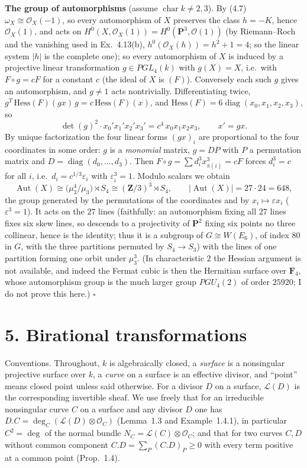 \documentclass[11pt]{article}
\begin{document}
\textbf{The group of automorphisms} (assume $\operatorname{char}k\ne2,3$). By (4.7) $\omega_X\cong\mathcal O_X(-1)$, so every automorphism of $X$ preserves the class $h=-K$, hence $\mathcal O_X(1)$, and acts on $H^0(X,\mathcal O_X(1))=H^0(\mathbf P^3,\mathcal O(1))$ (by Riemann--Roch and the vanishing used in Ex.~4.13(b), $h^0(\mathcal O_X(h))=h^2+1=4$; so the linear system $|h|$ is the complete one); so every automorphism of $X$ is induced by a projective linear transformation $g\in PGL_4(k)$ with $g(X)=X$, i.e.\ with $F\circ g=cF$ for a constant $c$ (the ideal of $X$ is $(F)$). Conversely each such $g$ gives an automorphism, and $g\neq 1$ acts nontrivially. Differentiating twice, $g^{T}\,\mathrm{Hess}(F)(gx)\,g=c\,\mathrm{Hess}(F)(x)$, and $\mathrm{Hess}(F)=6\operatorname{diag}(x_0,x_1,x_2,x_3)$, so
\[
\det(g)^2\cdot x_0'x_1'x_2'x_3'=c^4\,x_0x_1x_2x_3,\qquad x'=gx .
\]
By unique factorization the four linear forms $(gx)_i$ are proportional to the four coordinates in some order: $g$ is a \emph{monomial} matrix, $g=DP$ with $P$ a permutation matrix and $D=\operatorname{diag}(d_0,\dots,d_3)$. Then $F\circ g=\sum d_i^3x_{\pi(i)}^3=cF$ forces $d_i^3=c$ for all $i$, i.e.\ $d_i=c^{1/3}\varepsilon_i$ with $\varepsilon_i^3=1$. Modulo scalars we obtain
\[
\operatorname{Aut}(X)\cong\bigl(\mu_3^4/\mu_3\bigr)\rtimes S_4\cong(\mathbf Z/3)^3\rtimes S_4,\qquad|\operatorname{Aut}(X)|=27\cdot24=648,
\]
the group generated by the permutations of the coordinates and by $x_i\mapsto\varepsilon x_i$ ($\varepsilon^3=1$). It acts on the $27$ lines (faithfully: an automorphism fixing all $27$ lines fixes six skew lines, so descends to a projectivity of $\mathbf P^2$ fixing six points no three collinear, hence is the identity; thus it is a subgroup of $G\cong W(E_6)$, of index $80$ in $G$, with the three partitions permuted by $S_4\to S_3$) with the lines of one partition forming one orbit under $\mu_3^3$. (In characteristic $2$ the Hessian argument is not available, and indeed the Fermat cubic is then the Hermitian surface over $\mathbf F_4$, whose automorphism group is the much larger group $PGU_4(2)$ of order $25920$; I do not prove this here.) \hfill$\square$

\section*{5. Birational transformations}

Conventions. Throughout, $k$ is algebraically closed, a \emph{surface} is a nonsingular projective surface over $k$, a \emph{curve} on a surface is an effective divisor, and ``point'' means closed point unless said otherwise. For a divisor $D$ on a surface, $\mathcal L(D)$ is the corresponding invertible sheaf. We use freely that for an irreducible nonsingular curve $C$ on a surface and any divisor $D$ one has $D.C=\deg_C(\mathcal L(D)\otimes\mathcal O_C)$ (Lemma~1.3 and Example~1.4.1), in particular $C^2=\deg$ of the normal bundle $N_C=\mathcal L(C)\otimes\mathcal O_C$; and that for two curves $C,D$ without common component $C.D=\sum_P(C.D)_P\ge0$ with every term positive at a common point (Prop.~1.4).
\end{document}
